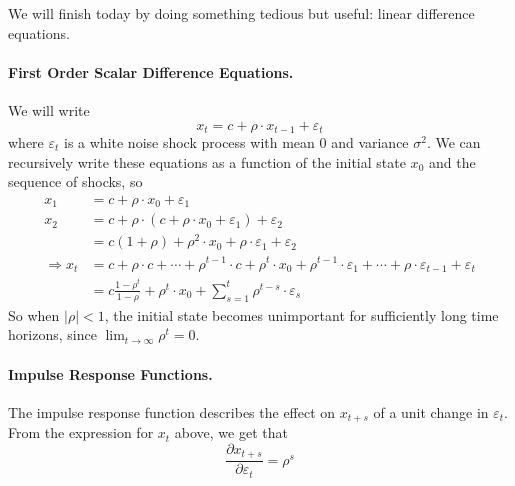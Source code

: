\documentclass[10pt]{article}
\begin{document}
We will finish today by doing something tedious but useful: linear difference equations. 

\paragraph{First Order Scalar Difference Equations.} We will write \[x_t = c + \rho \cdot x_{t-1} + \varepsilon_t\]where $\varepsilon_t$ is a white noise shock process with mean 0 and variance $\sigma^2$. We can recursively write these equations as a function of the initial state $x_0$ and the sequence of shocks, so 
\begin{align*}
	x_1 &= c + \rho \cdot x_0 + \varepsilon_1 \\
	x_2 &= c + \rho \cdot (c + \rho \cdot x_0 + \varepsilon_1) + \varepsilon_2 \\
	&= c(1 + \rho) + \rho^2 \cdot x_0 + \rho \cdot \varepsilon_1 + \varepsilon_2 \\
	\Longrightarrow x_t &= c + \rho \cdot c + \cdots + \rho^{t-1}\cdot c + \rho^t \cdot x_0 + \rho^{t-1} \cdot \varepsilon_1 + \cdots + \rho \cdot \varepsilon_{t-1} + \varepsilon_t \\
	&= c \frac{1-\rho^{t}}{1-\rho} + \rho^t \cdot x_0 + \sum_{s=1}^t \rho^{t-s} \cdot\varepsilon_s
\end{align*}
So when $|\rho| < 1$, the initial state becomes unimportant for sufficiently long time horizons, since $\lim_{t\to\infty} \rho^t = 0$.

\paragraph{Impulse Response Functions.} The impulse response function describes the effect on $x_{t+s}$ of a unit change in $\varepsilon_t$. From the expression for $x_t$ above, we get that\[\frac{\partial x_{t+s}}{\partial \varepsilon_t} = \rho^s\]
\end{document}
